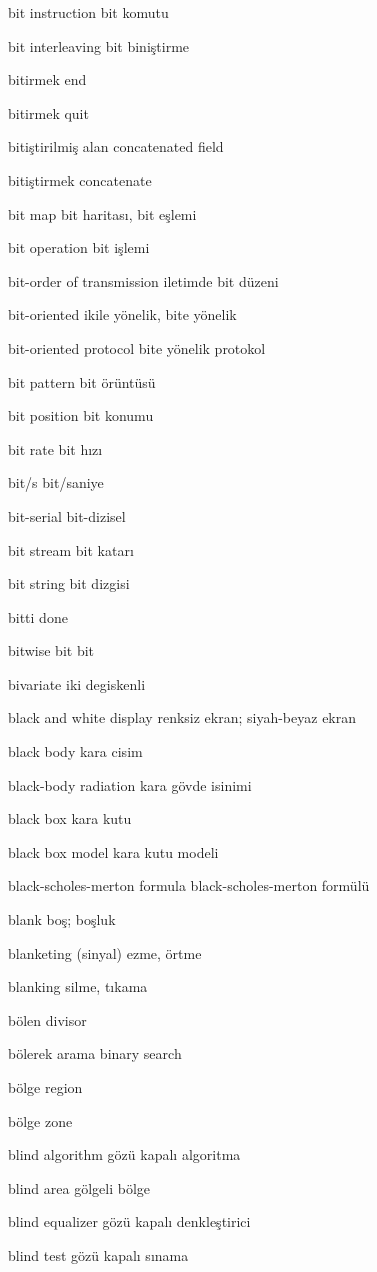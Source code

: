 \documentclass[12pt,fleqn]{article}\usepackage{../../common}
\begin{document}
bit instruction bit komutu

bit interleaving bit biniştirme

bitirmek end

bitirmek quit

bitiştirilmiş alan concatenated field

bitiştirmek concatenate

bit map bit haritası, bit eşlemi

bit operation bit işlemi

bit-order of transmission iletimde bit düzeni

bit-oriented ikile yönelik, bite yönelik

bit-oriented protocol bite yönelik protokol

bit pattern bit örüntüsü

bit position bit konumu

bit rate bit hızı

bit/s bit/saniye

bit-serial bit-dizisel

bit stream bit katarı

bit string bit dizgisi

bitti done

bitwise bit bit

bivariate iki degiskenli

black and white display renksiz ekran; siyah-beyaz ekran

black body kara cisim

black-body radiation kara gövde isinimi

black box kara kutu

black box model kara kutu modeli

black-scholes-merton formula black-scholes-merton formülü

blank boş; boşluk

blanketing (sinyal) ezme, örtme

blanking silme, tıkama

bölen divisor

bölerek arama binary search

bölge region

bölge zone

blind algorithm gözü kapalı algoritma

blind area gölgeli bölge

blind equalizer gözü kapalı denkleştirici

blind test gözü kapalı sınama
\end{document}
